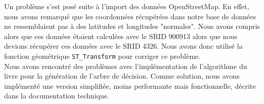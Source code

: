 Un problème s'est posé suite à l'import des données OpenStreetMap. En effet, nous avons remarqué que les coordonnées récupérées dans notre base de données ne ressemblaient pas à des latitudes et longitudes "normales". Nous avons compris alors que ces données étaient calculées avec le SRID 900913 alors que nous devions récupérer ces données avec le SRID 4326. Nous avons donc utilisé la fonction géométrique \texttt{ST\_Transform} pour corriger ce problème.\\

Nous avons rencontré des problèmes avec l'implémentation de l'algorithme du livre pour la génération de l'arbre de décision.
Comme solution, nous avons implémenté une version simplifiée, moins performante mais fonctionnelle,
décrite dans la documentation technique.
